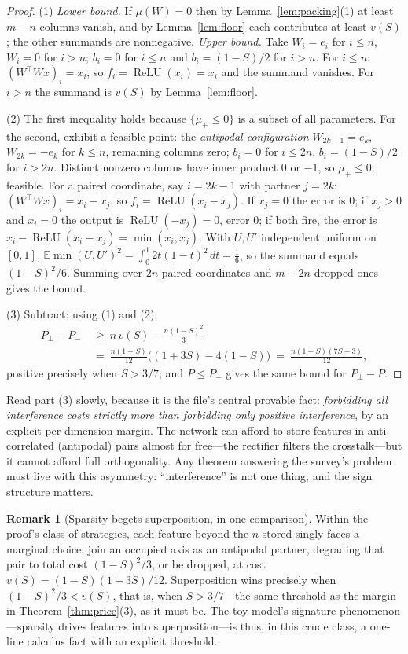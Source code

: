 \documentclass[11pt]{amsart}
\theoremstyle{plain}
\theoremstyle{definition}
\newtheorem{remark}[theorem]{Remark}
\DeclareMathOperator{\relu}{ReLU}
\newcommand{\E}{\mathbb{E}}
\begin{document}
\begin{proof}
(1) \emph{Lower bound.} If $\mu(W)=0$ then by Lemma~\ref{lem:packing}(1) at least $m-n$ columns vanish, and by Lemma~\ref{lem:floor} each contributes at least $v(S)$; the other summands are nonnegative. \emph{Upper bound.} Take $W_i=e_i$ for $i\le n$, $W_i=0$ for $i>n$; $b_i=0$ for $i\le n$ and $b_i = (1-S)/2$ for $i>n$. For $i\le n$: $(W^{\top}Wx)_i=x_i$, so $f_i=\relu(x_i)=x_i$ and the summand vanishes. For $i>n$ the summand is $v(S)$ by Lemma~\ref{lem:floor}.

(2) The first inequality holds because $\{\mu_+\le0\}$ is a subset of all parameters. For the second, exhibit a feasible point: the \emph{antipodal configuration} $W_{2k-1}=e_k$, $W_{2k}=-e_k$ for $k\le n$, remaining columns zero; $b_i=0$ for $i\le 2n$, $b_i=(1-S)/2$ for $i>2n$. Distinct nonzero columns have inner product $0$ or $-1$, so $\mu_+\le0$: feasible. For a paired coordinate, say $i=2k-1$ with partner $j=2k$: $(W^{\top}Wx)_i = x_i-x_j$, so $f_i=\relu(x_i-x_j)$. If $x_j=0$ the error is $0$; if $x_j>0$ and $x_i=0$ the output is $\relu(-x_j)=0$, error $0$; if both fire, the error is $x_i-\relu(x_i-x_j)=\min(x_i,x_j)$. With $U,U'$ independent uniform on $[0,1]$, $\E\min(U,U')^2=\int_0^1 2t(1-t)^2\,dt=\tfrac16$, so the summand equals $(1-S)^2/6$. Summing over $2n$ paired coordinates and $m-2n$ dropped ones gives the bound.

(3) Subtract: using (1) and (2),
\begin{align*}
P_\perp - P_- \ &\ge\ n\,v(S) - \frac{n(1-S)^2}{3} \\
&=\ \frac{n(1-S)}{12}\bigl((1+3S) - 4(1-S)\bigr) \ =\ \frac{n(1-S)(7S-3)}{12},
\end{align*}
positive precisely when $S>3/7$; and $P\le P_-$ gives the same bound for $P_\perp-P$.
\end{proof}

Read part (3) slowly, because it is the file's central provable fact: \emph{forbidding all interference costs strictly more than forbidding only positive interference}, by an explicit per-dimension margin. The network can afford to store features in anti-correlated (antipodal) pairs almost for free---the rectifier filters the crosstalk---but it cannot afford full orthogonality. Any theorem answering the survey's problem must live with this asymmetry: ``interference'' is not one thing, and the sign structure matters.

\begin{remark}[Sparsity begets superposition, in one comparison]\label{rem:threshold}
Within the proof's class of strategies, each feature beyond the $n$ stored singly faces a marginal choice: join an occupied axis as an antipodal partner, degrading that pair to total cost $(1-S)^2/3$, or be dropped, at cost $v(S)=(1-S)(1+3S)/12$. Superposition wins precisely when $(1-S)^2/3 < v(S)$, that is, when $S>3/7$---the same threshold as the margin in Theorem~\ref{thm:price}(3), as it must be. The toy model's signature phenomenon---sparsity drives features into superposition---is thus, in this crude class, a one-line calculus fact with an explicit threshold.
\end{remark}
\end{document}
